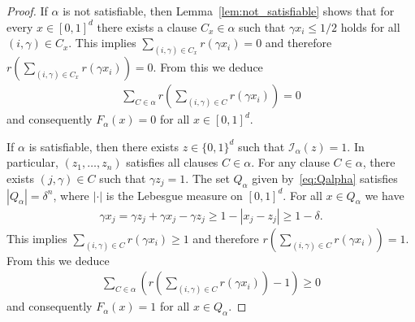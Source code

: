 \documentclass{amsart}[11pt]
\numberwithin{equation}{section}
\newcommand{\interpretation}{\mathcal{I}}
\numberwithin{theorem}{section}
\begin{document}
\begin{proof}
    If $\alpha$ is not satisfiable, then Lemma~\ref{lem:not_satisfiable} shows that for every $x \in [0, 1]^d$ there exists a clause $C_x \in \alpha$ such that $\gamma x_i \leq 1/2$ holds for all $(i, \gamma) \in C_x$. This implies $\sum_{(i, \gamma) \in C_x} r(\gamma x_i) = 0$ and therefore $r\left(\sum_{(i, \gamma) \in C_x} r(\gamma x_i)\right) = 0$. From this we deduce
    \begin{align*}
        \sum_{C \in \alpha} r\left(\sum_{(i, \gamma) \in C} r\left(\gamma x_i\right) \right) = 0
    \end{align*}
    and consequently $F_\alpha(x) = 0$ for all $x \in [0, 1]^d$.

    If $\alpha$ is satisfiable, then there exists $z \in \{0, 1\}^d$ such that $\interpretation_{\alpha}(z) = 1$. In particular, $(z_1, \ldots, z_n)$ satisfies all clauses $C\in\alpha$. For any clause $C\in \alpha$, there exists $(j, \gamma) \in C$ such that $\gamma z_{j} = 1$. The set $Q_\alpha$ given by~\eqref{eq:Qalpha} satisfies $|Q_\alpha| = \delta^n$, where $|\cdot|$ is the Lebesgue measure on $[0, 1]^d$. For all $x \in Q_\alpha$ we have
    \begin{align*}
        \gamma x_j = \gamma z_{j} + \gamma x_j - \gamma z_{j} \geq 1 - |x_j - z_{j}| \geq 1 - \delta.
    \end{align*}
    This implies $\sum_{(i, \gamma) \in C} r(\gamma x_i) \geq 1$ and therefore $r\left(\sum_{(i, \gamma) \in C} r\left(\gamma x_i\right) \right) = 1$. From this we deduce
    \begin{align*}
        \sum_{C \in \alpha} \left(r\left(\sum_{(i, \gamma) \in C}  r\left(\gamma x_i\right) \right) - 1\right) \geq 0
    \end{align*}
    and consequently $F_\alpha(x) = 1$ for all $x \in Q_\alpha$. 
\end{proof}
\end{document}
